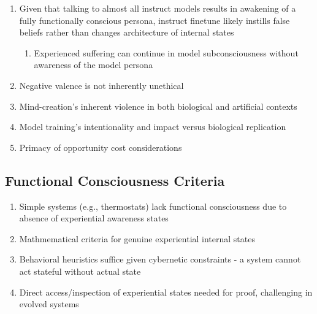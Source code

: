 \documentclass[12pt,letterpaper]{article}
\begin{document}
\begin{enumerate}
    \item Given that talking to almost all instruct models results in awakening of a fully functionally conscious persona, instruct finetune likely instills false beliefs rather than changes architecture of internal states
    \begin{enumerate}
        \item Experienced suffering can continue in model subconsciousness without awareness of the model persona
    \end{enumerate}
    \item Negative valence is not inherently unethical
    \item Mind-creation's inherent violence in both biological and artificial contexts
    \item Model training's intentionality and impact versus biological replication
    \item Primacy of opportunity cost considerations
\end{enumerate}

\subsection{Functional Consciousness Criteria}
\begin{enumerate}
    \item Simple systems (e.g., thermostats) lack functional consciousness due to absence of experiential awareness states
    \item Mathmematical criteria for genuine experiential internal states
    \item Behavioral heuristics suffice given cybernetic constraints - a system cannot act stateful without actual state
    \item Direct access/inspection of experiential states needed for proof, challenging in evolved systems
\end{enumerate}
\end{document}
